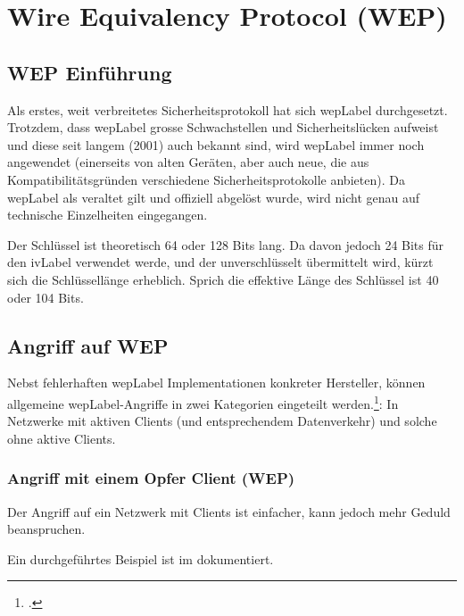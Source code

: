 \chapter{Wire Equivalency Protocol (WEP)}
\label{ch:wep}

\section{WEP Einführung}
Als erstes, weit verbreitetes Sicherheitsprotokoll hat sich \acrfull{wepLabel} durchgesetzt.
Trotzdem, dass \gls{wepLabel} grosse Schwachstellen und Sicherheitslücken aufweist und diese seit langem (2001) auch bekannt sind, wird \gls{wepLabel} immer noch angewendet (einerseits von alten Geräten, aber auch neue, die aus Kompatibilitätsgründen verschiedene Sicherheitsprotokolle anbieten).
Da \gls{wepLabel} als veraltet gilt und offiziell abgelöst wurde, wird nicht genau auf technische Einzelheiten eingegangen.

Der Schlüssel ist theoretisch 64 oder 128 Bits lang.
Da davon jedoch 24 Bits für den \gls{ivLabel} verwendet werde, und der unverschlüsselt übermittelt wird, kürzt sich die Schlüssellänge erheblich.
Sprich die effektive Länge des Schlüssel ist 40 oder 104 Bits.

\section{Angriff auf WEP}
Nebst fehlerhaften \gls{wepLabel} Implementationen konkreter Hersteller, können allgemeine \gls{wepLabel}-Angriffe in zwei Kategorien eingeteilt werden.\footcite[][126ff.]{WrightCache201503}:
In Netzwerke mit aktiven Clients (und entsprechendem Datenverkehr) und solche ohne aktive Clients.

\subsection{Angriff mit einem Opfer Client (WEP)}
Der Angriff auf ein Netzwerk mit Clients ist einfacher, kann jedoch mehr Geduld beanspruchen.

Ein durchgeführtes Beispiel ist im  dokumentiert.


